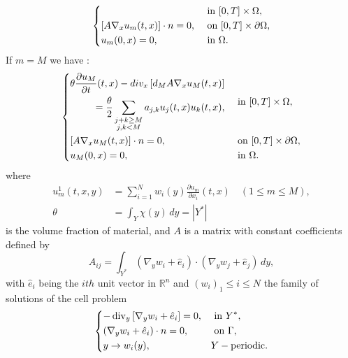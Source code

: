 \begin{theorem}
\begin{equation}
\begin{dcases}
\begin{split}
    \end{split}& \text { in }[0, T]\times\Omega,\\ 
    {\left[A \nabla_{x} u_{m}(t, x)\right] \cdot n=0}, & \text { on }[0, T]\times\partial\Omega, \\ 
    u_{m}(0, x)=0, & \text { in }\Omega.
\end{dcases}
\label{eq 17}\end{equation}
If $m=M$ we have :
\begin{equation}
  \begin{dcases}
    \begin{split}
        \theta \frac{\partial u_{M}}{\partial t}(t, x)-d i v_{x}\left[d_{M} A \nabla_{x} u_{M}(t, x)\right] & \\ =\frac{\theta}{2} \sum_{\substack{j+k \geq M \\ j,k<M}} a_{j, k} u_{j}(t, x) u_{k}(t, x),
    \end{split} & \text { in }[0, T]\times\Omega,\\ 
    {\left[A \nabla_{x} u_{M}(t, x)\right] \cdot n=0}, & \text { on }[0, T]\times\partial\Omega, \\ 
    u_{M}(0, x)=0,& \text { in }\Omega.
\end{dcases}
\label{eq 18}\end{equation}
where
$$
\begin{aligned}
u_{m}^{1}(t, x, y) &=\sum_{i=1}^{N} w_{i}(y) \frac{\partial u_{m}}{\partial x_{i}}(t, x) \quad(1 \leq m \leq M), \\
\theta &=\int_{Y} \chi(y) \, d  y=\left|Y^{*}\right|
\end{aligned}
$$
is the volume fraction of material, and $A$ is a matrix with constant coefficients defined by
\begin{equation*}
A_{i j}=\int_{Y^{*}}\left(\nabla_{y} w_{i}+\hat{e}_{i}\right) \cdot\left(\nabla_{y} w_{j}+\hat{e}_{j}\right) \, d  y,
\end{equation*}
with  $\hat{e}_{i}$ being the $ith$ unit vector in $\mathbb{R}^n$ and $(w_i)_1\leq i \leq N$ the family of solutions of the cell problem
\begin{equation}
    \begin{dcases}
        -\operatorname{div}_{y}\left[\nabla_{y} w_{i}+\hat{e}_{i}\right]=0, & \text { in } Y^{*}, \\
        \left(\nabla_{y} w_{i}+\hat{e}_{i}\right) \cdot n=0, & \text { on } \Gamma, \\
        y \rightarrow w_{i}(y), & Y-\text {periodic}.
    \end{dcases}
    \label{eq 19}
\end{equation}
\label{thm 5.1}
\end{theorem}
